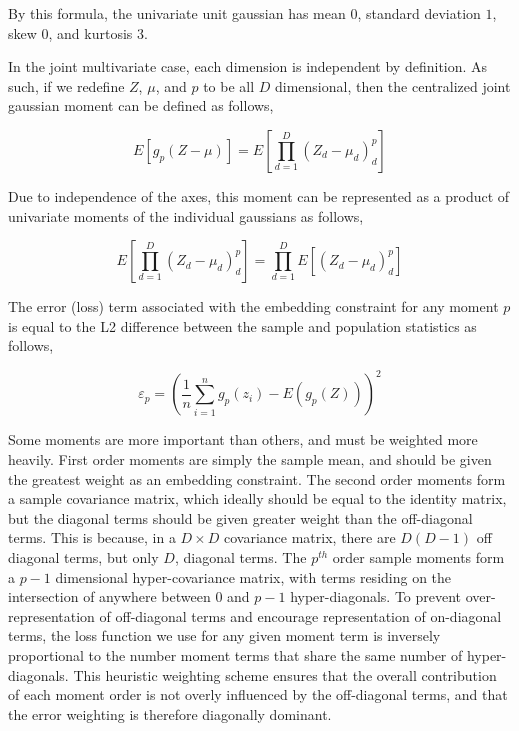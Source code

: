 \documentclass[10pt,twocolumn,letterpaper]{article}
\begin{document}
By this formula, the univariate unit gaussian has mean $0$, standard deviation $1$, skew $0$, and kurtosis $3$.

In the joint multivariate case, each dimension is independent by definition.  As such, if we redefine $Z$, $\mu$, and $p$ to be all $D$ dimensional, then the centralized joint gaussian moment can be defined as follows,

\begin{equation}
	E\left[g_p(Z - \mu)\right] = E\left[ \prod_{d=1}^D (Z_d - \mu_d)^p_d \right]
\end{equation}

Due to independence of the axes, this moment can be represented as a product of univariate moments of the individual gaussians as follows,

\begin{equation}
	E\left[ \prod_{d=1}^D (Z_d - \mu_d)^p_d \right] = \prod_{d=1}^D E\left[ (Z_d - \mu_d)^p_d \right]
\end{equation}

The error (loss) term associated with the embedding constraint for any moment $p$ is equal to the L2 difference between the sample and population statistics as follows,

\begin{equation}
	\varepsilon_p = \left( \frac{1}{n} \sum_{i=1}^n g_p(z_i) - E(g_p(Z)) \right)^2
\end{equation}

Some moments are more important than others, and must be weighted more heavily.  
First order moments are simply the sample mean, and should be given the greatest weight as an embedding constraint.  
The second order moments form a sample covariance matrix, which ideally should be equal to the identity matrix, but the diagonal terms should be given greater weight than the off-diagonal terms.  
This is because, in a $D \times D$ covariance matrix, there are $D(D-1)$ off diagonal terms, but only $D$, diagonal terms.  
The $p^{th}$ order sample moments form a $p-1$ dimensional hyper-covariance matrix, with terms residing on the intersection of anywhere between $0$ and $p-1$ hyper-diagonals.  
To prevent over-representation of off-diagonal terms and encourage representation of on-diagonal terms, the loss function we use for any given moment term is inversely proportional to the number moment terms that share the same number of hyper-diagonals.  
This heuristic weighting scheme ensures that the overall contribution of each moment order is not overly influenced by the off-diagonal terms, and that the error weighting is therefore diagonally dominant.
\end{document}
